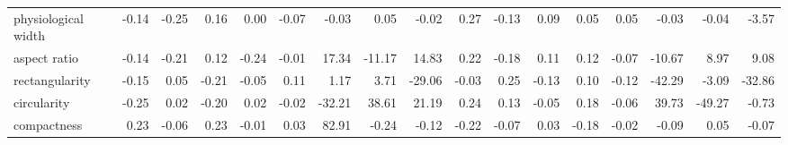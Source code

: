 \documentclass{article}
\begin{document}
\begin{table}[!ht]
{\begin{tabular}{lrrrrrrrrrrrrrrrr}
physiological width                                                     & -0.14                    & -0.25                    & 0.16                     & 0.00                     & -0.07                    & -0.03                    & 0.05                     & -0.02                    & 0.27                     & -0.13                    & 0.09                     & 0.05                     & 0.05                     & -0.03                    & -0.04                    & -3.57                    \\
aspect ratio                                                            & -0.14                    & -0.21                    & 0.12                     & -0.24                    & -0.01                    & 17.34                    & -11.17                   & 14.83                    & 0.22                     & -0.18                    & 0.11                     & 0.12                     & -0.07                    & -10.67                   & 8.97                     & 9.08                     \\
rectangularity                                                          & -0.15                    & 0.05                     & -0.21                    & -0.05                    & 0.11                     & 1.17                     & 3.71                     & -29.06                   & -0.03                    & 0.25                     & -0.13                    & 0.10                     & -0.12                    & -42.29                   & -3.09                    & -32.86                   \\
circularity                                                             & -0.25                    & 0.02                     & -0.20                    & 0.02                     & -0.02                    & -32.21                   & 38.61                    & 21.19                    & 0.24                     & 0.13                     & -0.05                    & 0.18                     & -0.06                    & 39.73                    & -49.27                   & -0.73                    \\
compactness                                                             & 0.23                     & -0.06                    & 0.23                     & -0.01                    & 0.03                     & 82.91                    & -0.24                    & -0.12                    & -0.22                    & -0.07                    & 0.03                     & -0.18                    & -0.02                    & -0.09                    & 0.05                     & -0.07                    \\

\end{tabular}}
\end{table}
\end{document}
